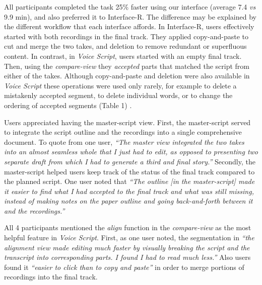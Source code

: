 \begin{mldescription}
 All participants completed the task 25\% faster using our interface (average 7.4  \textit{vs} 9.9 min), and also preferred it to Interface-R. The difference may be explained by the different workflow that each interface affords. In Interface-R, users effectively started with both recordings in the final track. They applied copy-and-paste to cut and merge the two takes, and deletion to remove redundant or superfluous content. In contrast, in \textit{Voice Script}, users started with an empty final track. Then, using the \textit{compare-view} they \textit{accepted} parts that matched the script from either of the takes. Although copy-and-paste and deletion  were also available in \textit{Voice Script} these operations were used only rarely, for example to delete a mistakenly accepted segment, to delete individual words, or to change the ordering of accepted segments (Table 1) . 

 Users appreciated having the master-script view. First, the master-script served to integrate the script outline and the recordings into a single comprehensive document. To quote from one user, \textit{``The master view integrated the two takes into an almost seamless whole that I just had to edit, as opposed to presenting two separate draft from which I had to generate a third and final story.''}  Secondly, the master-script helped users keep track of the status of the final track compared to the planned script. One user noted that \textit{``The outline [in the master-script] made it easier to find what I had accepted to the final track and what was still missing, instead of making notes on the paper outline and going back-and-forth between it and the recordings.'' } 

  All 4 participants mentioned the \textit{align} function in the \textit{compare-view} as the most helpful feature in \textit{Voice Script}. First, as one user noted, the segmentation in \textit{``the alignment view made editing much faster by visually breaking the script and the transcript into corresponding parts. I found I had to read much less.''} Also users found it \textit{``easier to click than to copy and paste''} in order to merge portions of recordings into the final track.  
\end{mldescription}
